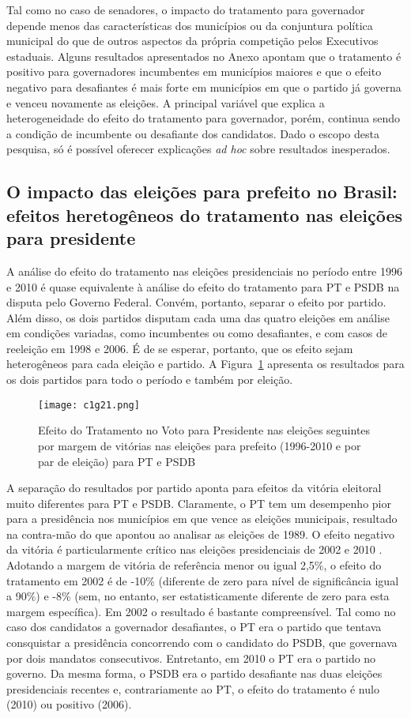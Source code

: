 Tal como no caso de senadores, o impacto do tratamento para governador depende menos das características dos municípios ou da conjuntura política municipal do que de outros aspectos da própria competição pelos Executivos estaduais. Alguns resultados apresentados no Anexo apontam que o tratamento é positivo para governadores incumbentes em municípios maiores e que o efeito negativo para desafiantes é mais forte em municípios em que o partido já governa e venceu novamente as eleições. A principal variável que explica a heterogeneidade do efeito do tratamento para governador, porém, continua sendo a condição de incumbente ou desafiante dos candidatos. Dado o escopo desta pesquisa, só é possível oferecer explicações \emph{ad hoc} sobre resultados inesperados.

\subsection{O impacto das eleições para prefeito no Brasil: efeitos heretogêneos do tratamento nas eleições para presidente}

A análise do efeito do tratamento nas eleições presidenciais no período entre 1996 e 2010 é quase equivalente à análise do efeito do tratamento para PT e PSDB na disputa pelo Governo Federal. Convém, portanto, separar o efeito por partido. Além disso, os dois partidos disputam cada uma das quatro eleições em análise em condições variadas, como incumbentes ou como desafiantes, e com casos de reeleição em 1998 e 2006. É de se esperar, portanto, que os efeito sejam heterogêneos para cada eleição e partido. A Figura~\ref{fig:c1g21} apresenta os resultados para os dois partidos para todo o período e também por eleição.

\begin{figure}[htp]
	\centering
	\texttt{[image: c1g21.png]} 
	\caption{Efeito do Tratamento no Voto para Presidente nas eleições seguintes por margem de vitórias nas eleições para prefeito (1996-2010 e por par de eleição) para PT e PSDB}
	\label{fig:c1g21} 
\end{figure}

A separação do resultados por partido aponta para efeitos da vitória eleitoral muito diferentes para PT e PSDB. Claramente, o PT tem um desempenho pior para a presidência nos municípios em que vence as eleições municipais, resultado na contra-mão do que apontou \citet{Ames1994} ao analisar as eleições de 1989. O efeito negativo da vitória é particularmente crítico nas eleições presidenciais de 2002 e 2010 . Adotando a margem de vitória de referência menor ou igual 2,5\%, o efeito do tratamento em 2002 é de -10\% (diferente de zero para nível de significância igual a 90\%) e -8\% (sem, no entanto, ser estatisticamente diferente de zero para esta margem específica). Em 2002 o resultado é bastante compreensível. Tal como no caso dos candidatos a governador desafiantes, o PT era o partido que tentava consquistar a presidência concorrendo com o candidato do PSDB, que governava por dois mandatos consecutivos. Entretanto, em 2010 o PT era o partido no governo. Da mesma forma, o PSDB era o partido desafiante nas duas eleições presidenciais recentes e, contrariamente ao PT, o efeito do tratamento é nulo (2010) ou positivo (2006).

